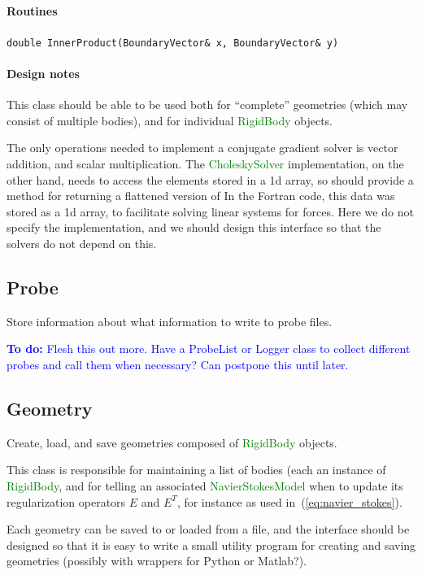 \documentclass[11pt]{article}
\def\todo#1{\textcolor{blue}{{\bf To do:} #1}}
\def\class#1{\textcolor{green}{\ttfamily\small #1}} %
\let\code\lstinline
\begin{document}
\paragraph{Routines}
\begin{description}
	\item \code|double InnerProduct(BoundaryVector& x, BoundaryVector& y)|
\end{description}

\paragraph{Design notes}
This class should be able to be used both for ``complete'' geometries (which may consist of multiple bodies), and for individual \class{RigidBody} objects.

The only operations needed to implement a conjugate gradient solver is vector addition, and scalar multiplication.  The \class{CholeskySolver} implementation, on the other hand, needs to access the elements stored in a 1d array, so should provide a method for returning a flattened version of 
In the Fortran code, this data was stored as a 1d array, to facilitate solving linear systems for forces.  Here we do not specify the implementation, and we should design this interface so that the solvers do not depend on this.

\subsection{Probe}
Store information about what information to write to probe files.

\todo{Flesh this out more.  Have a ProbeList or Logger class to collect different probes and call them when necessary?  Can postpone this until later.}

\subsection{Geometry}
Create, load, and save geometries composed of \class{RigidBody} objects.

This class is responsible for maintaining a list of bodies (each an instance of \class{RigidBody}, and for telling an associated \class{NavierStokesModel} when to update its regularization operators $E$ and $E^T$, for instance as used in~(\ref{eq:navier_stokes}).

Each geometry can be saved to or loaded from a file, and the interface should be designed so that it is easy to write a small utility program for creating and saving geometries (possibly with wrappers for Python or Matlab?).  
\end{document}
